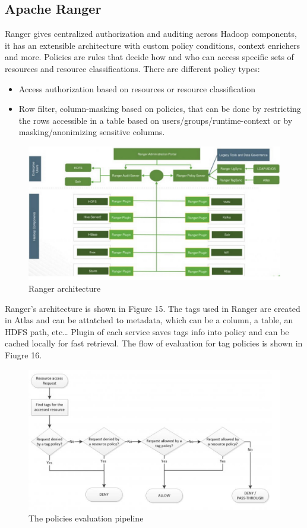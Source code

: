 \subsection{Apache Ranger}
Ranger gives centralized authorization and auditing across Hadoop components, it has an extensible architecture with custom policy conditions, context enrichers and more. \n
Policies are rules that decide how and who can access specific sets of resources and resource classifications. There are different policy types:
\begin{itemize}
    \item Access authorization based on resources or resource classification
    \item Row filter, column-masking based on policies, that can be done by restricting the rows accessible in a table based on users/groups/runtime-context or by masking/anonimizing sensitive columns.
\end{itemize}
\begin{figure}
    \centering
    \includegraphics[scale=0.2]{img/Ranger_architecture.jpeg}
    \caption{Ranger architecture}
\end{figure}
Ranger's architecture is shown in Figure 15. \n
The tags used in Ranger are created in Atlas and can be attatched to metadata, which can be a column, a table, an HDFS path, etc\dots \n
Plugin of each service saves tags info into policy and can be cached locally for fast retrieval. The flow of evaluation for tag policies is shown in Fiugre 16.
\begin{figure}
    \centering
    \includegraphics[scale=0.2]{img/policies_evaluation.jpeg}
    \caption{The policies evaluation pipeline}
\end{figure}
